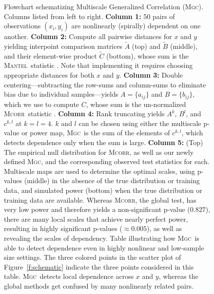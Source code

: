 \documentclass[11pt]{article}
\providecommand{\sct}[1]{{\normalfont\textsc{#1}}}
\newcommand{\G}{c}
\newcommand{\Mgc}{\sct{Mgc}}
\newcommand{\Mcorr}{\sct{Mcorr}}
\newcommand{\Mantel}{\sct{Mantel}}
\begin{document}
\addtocounter{figure}{-1}

\begin{figure}[htbp]
\caption{
Flowchart schematizing Multiscale Generalized Correlation (\Mgc). Columns listed from left to right.
\textbf{Column 1:} 50 pairs of observations $(x_i,y_i)$ are nonlinearly (spirally) dependent on one another.
% 
\textbf{Column 2:} Compute all pairwise distances for $x$ and $y$ yielding interpoint comparison matrices
 $\tilde{A}$ (top) and $\tilde{B}$ (middle), 
and their element-wise product $\tilde{C}$ (bottom), whose sum is the  \Mantel~statistic \cite{Mantel1967}.
Note that implementing it requires choosing appropriate distances for both $x$ and $y$.  
% 
\textbf{Column 3:} Double centering---subtracting the row-sums and column-sums to eliminate bias due to individual samples---yields $A=\{a_{ij}\}$ and $B=\{b_{ij}\}$, which we use to compute $C$, whose sum is the un-normalized \Mcorr~statistic \cite{SzekelyRizzo2013a}.
% 
\textbf{Column 4:} Rank truncating yields $A^{k}$, $B^{l}$, and $\G^{k,l}$ at $k=l=4$.  $k$ and $l$ can be chosen using either the multiscale p-value or power map, \Mgc~is the sum of the elements of $\G^{k,l}$, which detects dependence only when the sum is large.
\textbf{Column 5:} (Top) The empirical null distribution for \Mcorr, as well as our newly defined \Mgc, and the corresponding observed test statistics for each. 
Multiscale  maps are used to determine the optimal scales, using p-values (middle)  in the absence of the true distribution or training data, and simulated power (bottom) when the true distribution or training data are available.  
Whereas \Mcorr, the global test, has very low power and therefore yields a non-significant p-value ($0.827$),  there are many local scales that achieve nearly perfect power, resulting in highly significant p-values ($\approx 0.005$), as well as revealing the scales of dependency. Table illustrating how \Mgc~is able to detect dependence even in highly nonlinear and low-sample size settings. The three colored points in the scatter plot of Figure~\ref{f:schematic} indicate the three points considered in this table. \Mgc~detects local dependence across $x$ and $y$, whereas the global methods get confused by many nonlinearly related pairs.}
\end{figure}
\clearpage
\end{document}
